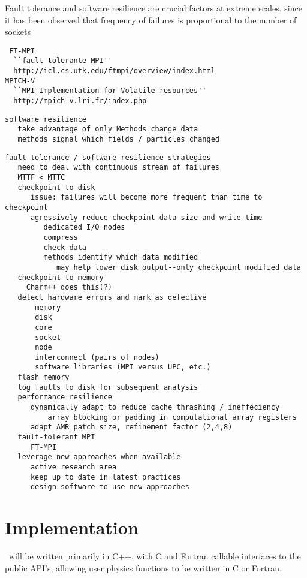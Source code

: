 \documentclass[10pt]{article}
\begin{document}
 Fault tolerance and software
resilience are crucial factors at extreme scales, since it has been
observed that frequency of failures is proportional to the number of
sockets~\cite{@@@}

\begin{verbatim}
 FT-MPI 
  ``fault-tolerante MPI''
  http://icl.cs.utk.edu/ftmpi/overview/index.html 
MPICH-V 
  ``MPI Implementation for Volatile resources''
  http://mpich-v.lri.fr/index.php 
\end{verbatim}


\begin{verbatim}
software resilience
   take advantage of only Methods change data
   methods signal which fields / particles changed
\end{verbatim}
\begin{verbatim}
fault-tolerance / software resilience strategies
   need to deal with continuous stream of failures
   MTTF < MTTC
   checkpoint to disk
      issue: failures will become more frequent than time to checkpoint
      agressively reduce checkpoint data size and write time
         dedicated I/O nodes
         compress
         check data
         methods identify which data modified
            may help lower disk output--only checkpoint modified data
   checkpoint to memory
     Charm++ does this(?)
   detect hardware errors and mark as defective
       memory
       disk
       core
       socket
       node
       interconnect (pairs of nodes)
       software libraries (MPI versus UPC, etc.)
   flash memory
   log faults to disk for subsequent analysis
   performance resilience
      dynamically adapt to reduce cache thrashing / ineffeciency
          array blocking or padding in computational array registers
      adapt AMR patch size, refinement factor (2,4,8)
   fault-tolerant MPI
      FT-MPI
   leverage new approaches when available
      active research area
      keep up to date in latest practices
      design software to use new approaches
\end{verbatim}


\section{Implementation} \label{s:implementation}

\cello\ will be written primarily in C++, with C and Fortran callable
interfaces to the public API's, allowing user physics functions to be
written in C or Fortran.  
\end{document}

